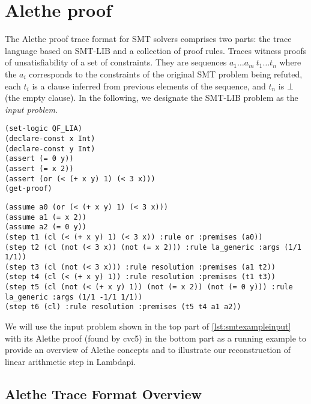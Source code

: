 \section{Alethe proof}
\label{sect:alethe}

The Alethe proof trace format \cite{alethespec} for SMT solvers comprises two parts: the trace language based on SMT-LIB and a collection of proof rules. Traces witness proofs of unsatisfiability of a set of constraints.
They are sequences $a_1 \dots a_m~t_1 \dots t_n$ where
the $a_i$ corresponds to the constraints of the original SMT problem being refuted, each $t_i$ is a clause inferred from previous elements of the sequence, and $t_n$ is $\bot$ (the empty clause).
In the following, we designate the SMT-LIB problem as the \emph{input problem}.

\begin{lstlisting}[language=SMT,label={lst:smtexampleinput}]
(set-logic QF_LIA)
(declare-const x Int)
(declare-const y Int)
(assert (= 0 y))
(assert (= x 2))
(assert (or (< (+ x y) 1) (< 3 x)))
(get-proof)
\end{lstlisting}

\begin{center}
\lightning
\end{center}

\begin{lstlisting}[language=SMT,caption={The following example is the proof for the unsatisfiability of $(x+y < 1) \lor (3<x), x = 2$ and $0 = y$.},label={lst:smtexampleproof}]
(assume a0 (or (< (+ x y) 1) (< 3 x)))
(assume a1 (= x 2))
(assume a2 (= 0 y))
(step t1 (cl (< (+ x y) 1) (< 3 x)) :rule or :premises (a0))
(step t2 (cl (not (< 3 x)) (not (= x 2))) :rule la_generic :args (1/1 1/1))
(step t3 (cl (not (< 3 x))) :rule resolution :premises (a1 t2))
(step t4 (cl (< (+ x y) 1)) :rule resolution :premises (t1 t3))
(step t5 (cl (not (< (+ x y) 1)) (not (= x 2)) (not (= 0 y))) :rule la_generic :args (1/1 -1/1 1/1))
(step t6 (cl) :rule resolution :premises (t5 t4 a1 a2))
\end{lstlisting}

We will use the input problem shown in the top part of \cref{lst:smtexampleinput} with its Alethe proof (found by cvc5) in the bottom part as a running example to provide an overview of Alethe concepts and to illustrate our reconstruction of linear arithmetic step in Lambdapi.

\subsection{Alethe Trace Format Overview}

